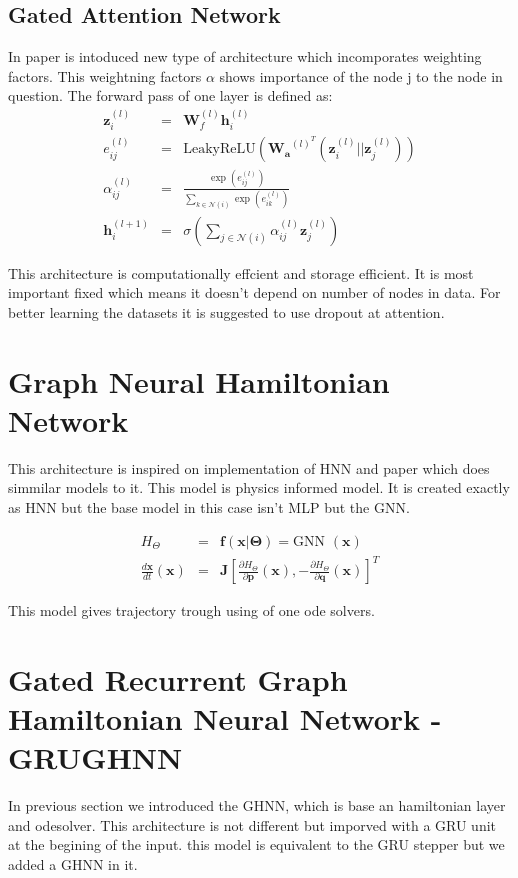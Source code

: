 \subsection{Gated Attention Network}
In paper \cite{} is intoduced new type of architecture which incomporates weighting factors. This weightning factors $\alpha$ shows importance of the node j to the node in question.
The forward pass of one layer is defined as:
\begin{eqnarray}
\mathbf{z}_i^{(l)}&=&\mathbf{W}_f^{(l)}\mathbf{h}_i^{(l)} \\
e_{ij}^{(l)}&=&\text{LeakyReLU}(\mathbf{W_a}^{(l)^T}(\mathbf{z}_i^{(l)}||\mathbf{z}_j^{(l)}))\\
\alpha_{ij}^{(l)}&=&\frac{\exp(e_{ij}^{(l)})}{\sum_{k\in \mathcal{N}(i)}^{}\exp(e_{ik}^{(l)})}\\
\mathbf{h}_i^{(l+1)}&=&\sigma\left(\sum_{j\in \mathcal{N}(i)} {\alpha^{(l)}_{ij} \mathbf{z}^{(l)}_j }\right)
\end{eqnarray}

This architecture is computationally effcient and storage efficient. It is most important fixed which means it doesn't depend on number of nodes in data.
For better learning the datasets it is suggested to use dropout at attention.












\section{Graph Neural Hamiltonian Network}
This architecture is inspired on implementation of HNN and paper \cite{} which does simmilar models to it. This model is physics informed model. It is created exactly as HNN but the base model in this case isn't MLP but the GNN.

\begin{eqnarray}
	H_{\Theta} &=& \mathbf{f}(\mathbf{x}|\boldsymbol{\Theta})=\text{GNN }(\mathbf{x})\\
	\frac{d\mathbf{x}}{dt}(\mathbf{x}) &=& \mathbf{J}\left[\frac{\partial H_{\Theta}}{\partial\mathbf{p}}(\mathbf{x}),-\frac{\partial H_{\Theta}}{\partial\mathbf{q}}(\mathbf{x})\right]^T
\end{eqnarray}

This model gives trajectory trough using of one ode solvers.

\section{Gated Recurrent Graph Hamiltonian Neural Network - GRUGHNN}
In previous section we introduced the GHNN, which is base an hamiltonian layer and odesolver. This architecture is not different but imporved with a GRU unit at the begining of the input. this model is equivalent to the GRU stepper but we added a GHNN in it.

